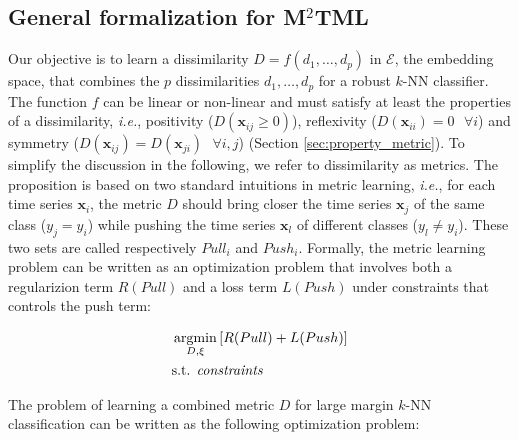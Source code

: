 \subsection{General formalization for M$^2$TML} 
Our objective is to learn a dissimilarity $D=f(d_1, \ldots, d_p)$ in $\mathcal{E}$, the embedding space, that combines the $p$ dissimilarities $d_1, \ldots, d_p$ for a robust $k$-NN classifier. The function $f$ can be linear or non-linear and must satisfy at least the properties of a dissimilarity, \textit{i.e.}, positivity ($D(\textbf{x}_{ij} \geq 0)$), reflexivity ($D(\textbf{x}_{ii})=0 \text{ }\forall i$) and symmetry ($D(\textbf{x}_{ij}) = D(\textbf{x}_{ji}) \text{ } \forall i,j$) (Section \ref{sec:property_metric}). To simplify the discussion in the following, we refer to dissimilarity as metrics. The proposition is based on two standard intuitions in metric learning, \textit{i.e.}, for each time series $\textbf{x}_i$, the metric $D$ should bring closer the time series $\textbf{x}_j$ of the same class ($y_j=y_i$) while pushing the time series $\textbf{x}_l$ of different classes ($y_l \neq y_i$). These two sets are called respectively $Pull_i$ and $Push_i$. 
Formally, the metric learning problem can be written as an optimization problem that involves both a regularizion term $R(Pull)$ and a loss term $L(Push)$ under constraints that controls the push term:

\begin{equation}
\begin{aligned}
&\displaystyle 		\argmin_{D,\xi} \left[  R(Pull) + L(Push) \right] \\
&\text{s.t. \textit{constraints} }
\end{aligned}
\end{equation}

\noindent The problem of learning a combined metric $D$ for large margin $k$-NN classification can be written as the following optimization problem:

